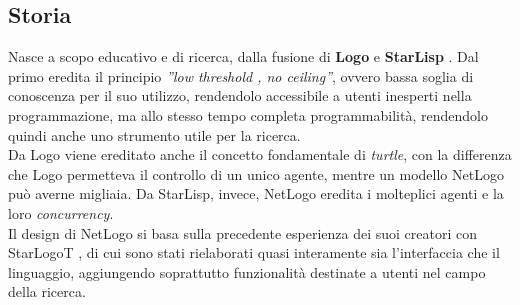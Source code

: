 \subsection{Storia}
Nasce a scopo educativo e di ricerca, dalla fusione di \textbf{Logo} \cite{logo} e \textbf{StarLisp} \cite{starlisp}. Dal primo eredita il principio \textit{”low threshold , no ceiling”}, ovvero bassa soglia di conoscenza per il suo utilizzo, rendendolo accessibile a utenti inesperti nella programmazione, ma allo stesso tempo completa programmabilità, rendendolo quindi anche uno strumento utile per la ricerca.\\
Da Logo viene ereditato anche il concetto fondamentale di \textit{turtle}, con la differenza che Logo permetteva il controllo di un unico agente, mentre un modello NetLogo può averne migliaia. Da StarLisp, invece, NetLogo eredita i molteplici agenti e la loro \textit{concurrency}.\\
Il design di NetLogo si basa sulla precedente esperienza dei suoi creatori con StarLogoT \cite{starlogot}, di cui sono stati rielaborati quasi interamente sia l'interfaccia che il linguaggio, aggiungendo soprattutto funzionalità destinate a utenti nel campo della ricerca.

